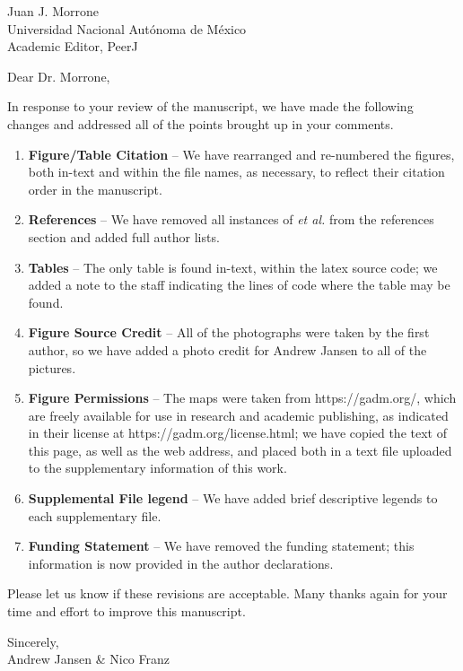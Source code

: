 \documentclass[10pt,letterpaper]{letter}
\begin{document}
 
\begin{letter}{Juan J. Morrone\\Universidad Nacional Aut\'{o}noma de M\'{e}xico\\Academic Editor, PeerJ} 
	\opening{Dear Dr. Morrone,} 

	In response to your review of the manuscript, we have made the following changes and addressed all of the points brought up in your comments.

	\begin{enumerate}
		\item \textbf{Figure/Table Citation} -- We have rearranged and re-numbered the figures, both in-text and within the file names, as necessary, to reflect their citation order in the manuscript.
		\item \textbf{References} -- We have removed all instances of \textit{et al.} from the references section and added full author lists.
		\item \textbf{Tables} -- The only table is found in-text, within the latex source code; we added a note to the staff indicating the lines of code where the table may be found.
		\item \textbf{Figure Source Credit} -- All of the photographs were taken by the first author, so we have added a photo credit for Andrew Jansen to all of the pictures. 
		\item \textbf{Figure Permissions} -- The maps were taken from https://gadm.org/, which are freely available for use in research and academic publishing, as indicated in their license at https://gadm.org/license.html; we have copied the text of this page, as well as the web address, and placed both in a text file uploaded to the supplementary information of this work.
		\item \textbf{Supplemental File legend} -- We have added brief descriptive legends to each supplementary file.
		\item \textbf{Funding Statement} -- We have removed the funding statement; this information is now provided in the author declarations.
	\end{enumerate}

	Please let us know if these revisions are acceptable.
	Many thanks again for your time and effort to improve this manuscript.

	\closing{Sincerely,\\Andrew Jansen \& Nico Franz}
\end{letter} 
\end{document}
